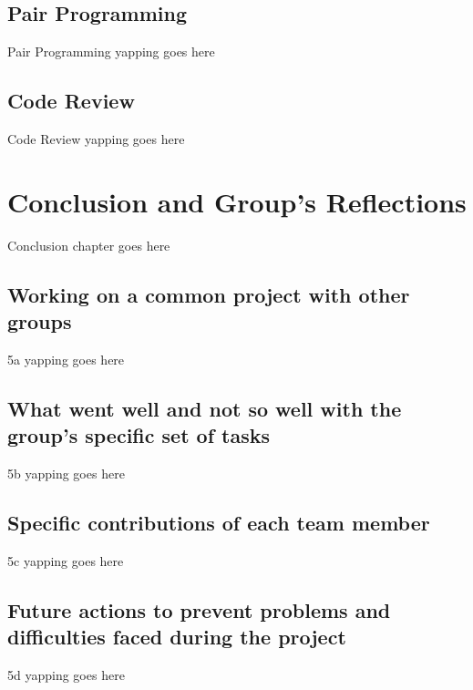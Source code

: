 \documentclass[12pt]{report}
\begin{document}
\section{Pair Programming}
Pair Programming yapping goes here

\section{Code Review}
Code Review yapping goes here

\chapter{Conclusion and Group's Reflections}
Conclusion chapter goes here

\section{Working on a common project with other groups}
5a yapping goes here

\section{What went well and not so well with the group's specific set of tasks}
5b yapping goes here

\section{Specific contributions of each team member}
5c yapping goes here

\section{Future actions to prevent problems and difficulties faced during the project}
5d yapping goes here
\end{document}
